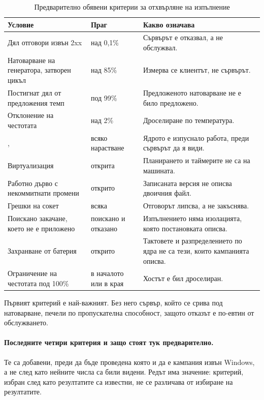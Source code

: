 \begin{table}[H]
\centering
\caption{Предварително обявени критерии за отхвърляне на изпълнение}
\label{tab:validity}
\begin{tabular}{@{}L{5.2cm}L{3.0cm}L{5.4cm}@{}}
\toprule
\textbf{Условие} & \textbf{Праг} & \textbf{Какво означава} \\
\midrule
Дял отговори извън 2xx & над 0,1\% & Сървърът е отказвал, а не обслужвал. \\
Натоварване на генератора, затворен цикъл & над 85\% & Измерва се клиентът, не сървърът. \\
Постигнат дял от предложения темп & под 99\% & Предложеното натоварване не е било предложено. \\
Отклонение на честотата & над 2\% & Дроселиране по температура. \\
,  & всяко нарастване & Ядрото е изпуснало работа, преди сървърът да я види. \\
Виртуализация & открита & Планирането и таймерите не са на машината. \\
Работно дърво с некоммитнати промени & открито & Записаната версия не описва двоичния файл. \\
Грешки на сокет & всяка & Отговорът липсва, а не закъснява. \\
Поискано закачане, което не е приложено & поискано и отказано & Изпълнението няма изолацията, която постановката описва. \\
Захранване от батерия & открито & Тактовете и разпределението по ядра не са тези, които кампанията описва. \\
Ограничение на честотата под 100\% & в началото или в края & Хостът е бил дроселиран. \\
\bottomrule
\end{tabular}
\end{table}

Първият критерий е най-важният. Без него сървър, който се срива под натоварване, печели по
пропускателна способност, защото отказът е по-евтин от обслужването.

\paragraph{Последните четири критерия и защо стоят тук предварително.} Те са добавени, преди да
бъде проведена която и да е кампания извън Windows, а не след като нейните числа са били
видени. Редът има значение: критерий, избран след като резултатите са известни, не се различава
от избиране на резултатите.

